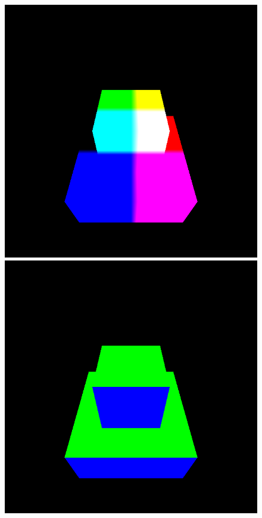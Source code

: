 \documentclass[format=sigconf]{acmart}
\begin{document}
\begin{figure}[H]
  \begin{center}
    \begin{minipage}{.2\textwidth}
      \includegraphics[width=1.0\textwidth]{pipeline-position.png}
    \end{minipage}
    \begin{minipage}{.2\textwidth}
      \includegraphics[width=1.0\textwidth]{pipeline-normal.png}

\end{minipage}
\end{center}
\end{figure}
\end{document}
